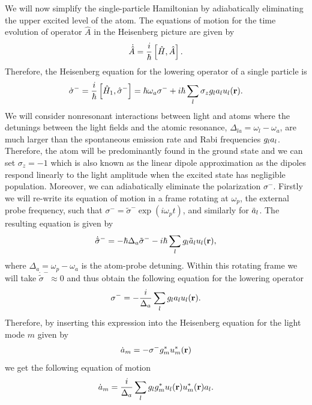We will now simplify the single-particle Hamiltonian by adiabatically
eliminating the upper excited level of the atom. The equations of
motion for the time evolution of operator $\hat{A}$ in the Heisenberg
picture are given by
\begin{equation}
  \dot{\hat{A}} = \frac{i}{\hbar} \left[\hat{H}, \hat{A} \right].
\end{equation}
Therefore, the Heisenberg equation for the lowering operator of a
single particle is
\begin{equation}
  \dot{\sigma}^- = \frac{i}{\hbar} \left[\hat{H}_1, \hat{\sigma}^- \right]
  = \hbar \omega_a \sigma^- + i \hbar \sum_l \sigma_z g_l a_l u_l(\mathbf{r}).
\end{equation}
We will consider nonresonant interactions between light and atoms
where the detunings between the light fields and the atomic resonance,
$\Delta_{la} = \omega_l - \omega_a$, are much larger than the
spontaneous emission rate and Rabi frequencies $g_l a_l$. Therefore,
the atom will be predominantly found in the ground state and we can
set $\sigma_z = -1$ which is also known as the linear dipole
approximation as the dipoles respond linearly to the light amplitude
when the excited state has negligible population. Moreover, we can
adiabatically eliminate the polarization $\sigma^-$. Firstly we will
re-write its equation of motion in a frame rotating at $\omega_p$, the
external probe frequency, such that
$\sigma^- = \tilde{\sigma}^- \exp(i \omega_p t)$, and similarly for
$\tilde{a}_l$. The resulting equation is given by
\begin{equation}
  \dot{\tilde{\sigma}}^- = - \hbar \Delta_a \tilde{\sigma}^- - i \hbar
  \sum_l g_l \tilde{a}_l u_l(\mathbf{r}),
\end{equation}
where $\Delta_a = \omega_p - \omega_a$ is the atom-probe
detuning. Within this rotating frame we will take
$\dot{\tilde{\sigma}}^- \approx 0$ and thus obtain the following
equation for the lowering operator
\begin{equation}
  \label{eq:sigmam}
  \sigma^- = - \frac{i}{\Delta_a} \sum_l g_l a_l u_l(\mathbf{r}).
\end{equation}
Therefore, by inserting this expression into the Heisenberg equation
for the light mode $m$ given by
\begin{equation}
  \dot{a}_m = - \sigma^- g^*_m u^*_m(\mathbf{r})
\end{equation}
we get the following equation of motion
\begin{equation}
  \dot{a}_m = \frac{i}{\Delta_a} \sum_l g_l g^*_m u_l(\mathbf{r})
  u^*_m(\mathbf{r}) a_l.
\end{equation}
